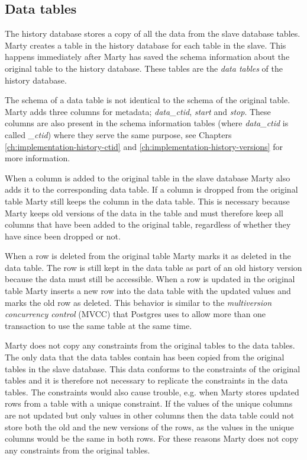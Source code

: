 \subsection{Data tables}
\label{ch:implementation-history-data}
The history database stores a copy of all the data from the slave database tables.
Marty creates a table in the history database for each table in the slave.
This happens immediately after Marty has saved the schema information about the original table to the history database.
These tables are the \textit{data tables} of the history database.

The schema of a data table is not identical to the schema of the original table.
Marty adds three columns for metadata; \textit{data\_ctid}, \textit{start} and \textit{stop}.
These columns are also present in the schema information tables (where \textit{data\_ctid} is called \textit{\_ctid}) where they serve the same purpose, see Chapters \ref{ch:implementation-history-ctid} and \ref{ch:implementation-history-versions} for more information.

When a column is added to the original table in the slave database Marty also adds it to the corresponding data table.
If a column is dropped from the original table Marty still keeps the column in the data table.
This is necessary because Marty keeps old versions of the data in the table and must therefore keep all columns that have been added to the original table, regardless of whether they have since been dropped or not.

When a row is deleted from the original table Marty marks it as deleted in the data table.
The row is still kept in the data table as part of an old history version because the data must still be accessible.
When a row is updated in the original table Marty inserts a new row into the data table with the updated values and marks the old row as deleted.
This behavior is similar to the \textit{multiversion concurrency control} (MVCC) that Postgres uses to allow more than one transaction to use the same table at the same time.

Marty does not copy any constraints from the original tables to the data tables.
The only data that the data tables contain has been copied from the original tables in the slave database.
This data conforms to the constraints of the original tables and it is therefore not necessary to replicate the constraints in the data tables.
The constraints would also cause trouble, e.g. when Marty stores updated rows from a table with a unique constraint.
If the values of the unique columns are not updated but only values in other columns then the data table could not store both the old and the new versions of the rows, as the values in the unique columns would be the same in both rows.
For these reasons Marty does not copy any constraints from the original tables.

